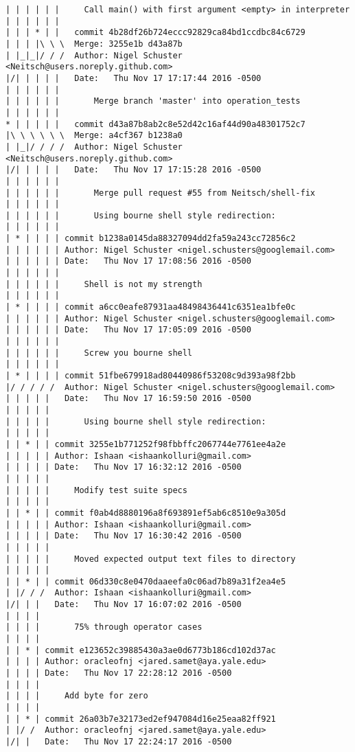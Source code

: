 \begin{lstlisting}
| | | | | |     Call main() with first argument <empty> in interpreter
| | | | | |         
| | | * | |   commit 4b28df26b724eccc92829ca84bd1ccdbc84c6729
| | | |\ \ \  Merge: 3255e1b d43a87b
| |_|_|/ / /  Author: Nigel Schuster <Neitsch@users.noreply.github.com>
|/| | | | |   Date:   Thu Nov 17 17:17:44 2016 -0500
| | | | | |   
| | | | | |       Merge branch 'master' into operation_tests
| | | | | |         
* | | | | |   commit d43a87b8ab2c8e52d42c16af44d90a48301752c7
|\ \ \ \ \ \  Merge: a4cf367 b1238a0
| |_|/ / / /  Author: Nigel Schuster <Neitsch@users.noreply.github.com>
|/| | | | |   Date:   Thu Nov 17 17:15:28 2016 -0500
| | | | | |   
| | | | | |       Merge pull request #55 from Neitsch/shell-fix
| | | | | |       
| | | | | |       Using bourne shell style redirection:
| | | | | |       
| * | | | | commit b1238a0145da88327094dd2fa59a243cc72856c2
| | | | | | Author: Nigel Schuster <nigel.schusters@googlemail.com>
| | | | | | Date:   Thu Nov 17 17:08:56 2016 -0500
| | | | | | 
| | | | | |     Shell is not my strength
| | | | | |       
| * | | | | commit a6cc0eafe87931aa48498436441c6351ea1bfe0c
| | | | | | Author: Nigel Schuster <nigel.schusters@googlemail.com>
| | | | | | Date:   Thu Nov 17 17:05:09 2016 -0500
| | | | | | 
| | | | | |     Screw you bourne shell
| | | | | |       
| * | | | | commit 51fbe679918ad80440986f53208c9d393a98f2bb
|/ / / / /  Author: Nigel Schuster <nigel.schusters@googlemail.com>
| | | | |   Date:   Thu Nov 17 16:59:50 2016 -0500
| | | | |   
| | | | |       Using bourne shell style redirection:
| | | | |      
| | * | | commit 3255e1b771252f98fbbffc2067744e7761ee4a2e
| | | | | Author: Ishaan <ishaankolluri@gmail.com>
| | | | | Date:   Thu Nov 17 16:32:12 2016 -0500
| | | | | 
| | | | |     Modify test suite specs
| | | | |      
| | * | | commit f0ab4d8880196a8f693891ef5ab6c8510e9a305d
| | | | | Author: Ishaan <ishaankolluri@gmail.com>
| | | | | Date:   Thu Nov 17 16:30:42 2016 -0500
| | | | | 
| | | | |     Moved expected output text files to directory
| | | | |      
| | * | | commit 06d330c8e0470daaeefa0c06ad7b89a31f2ea4e5
| |/ / /  Author: Ishaan <ishaankolluri@gmail.com>
|/| | |   Date:   Thu Nov 17 16:07:02 2016 -0500
| | | |   
| | | |       75% through operator cases
| | | |     
| | * | commit e123652c39885430a3ae0d6773b186cd102d37ac
| | | | Author: oracleofnj <jared.samet@aya.yale.edu>
| | | | Date:   Thu Nov 17 22:28:12 2016 -0500
| | | | 
| | | |     Add byte for zero
| | | |     
| | * | commit 26a03b7e32173ed2ef947084d16e25eaa82ff921
| |/ /  Author: oracleofnj <jared.samet@aya.yale.edu>
|/| |   Date:   Thu Nov 17 22:24:17 2016 -0500

\end{lstlisting}

